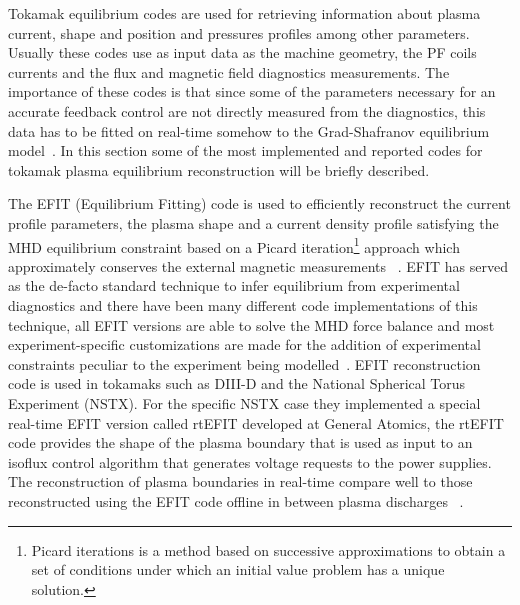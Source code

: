 Tokamak equilibrium codes are used for retrieving information about plasma current, shape and position and pressures profiles among other parameters. Usually these codes use as input data as the machine geometry, the PF coils currents and the flux and magnetic field diagnostics measurements. The importance of these codes is that since some of the parameters necessary for an accurate feedback control are not directly measured from the diagnostics,  this data has to be fitted on real-time somehow to the Grad-Shafranov equilibrium model~\cite{Shafranov1971}. In this section some of the most implemented and reported codes for tokamak plasma equilibrium reconstruction will be briefly  described.
\smallskip 


The EFIT (Equilibrium Fitting) code is used to efficiently reconstruct the current profile parameters, the plasma shape  and a current density profile satisfying the MHD equilibrium constraint  based on a Picard iteration\footnote{Picard iterations is a method based on  successive approximations to obtain a set of conditions under which an initial value problem has a unique solution.} approach which approximately conserves the external magnetic measurements ~\cite{EFIT1985}. EFIT has served as the de-facto standard technique to infer equilibrium from experimental diagnostics and there have been many different code implementations of this technique, all EFIT versions  are able to solve the MHD force balance and most experiment-specific customizations are made for the addition of experimental constraints peculiar to the experiment being modelled~\cite{EFIT2013}. EFIT reconstruction code is used in tokamaks such as DIII-D and the National Spherical Torus Experiment (NSTX). For the specific NSTX case they implemented a special real-time EFIT version called rtEFIT developed at General Atomics, the rtEFIT code provides the shape of the plasma boundary that is used as input to an isoflux control algorithm that generates voltage requests to the power supplies. The reconstruction of plasma boundaries  in real-time compare well to those reconstructed using the EFIT code offline in between plasma discharges ~\cite{rtEFIT}.
\smallskip


